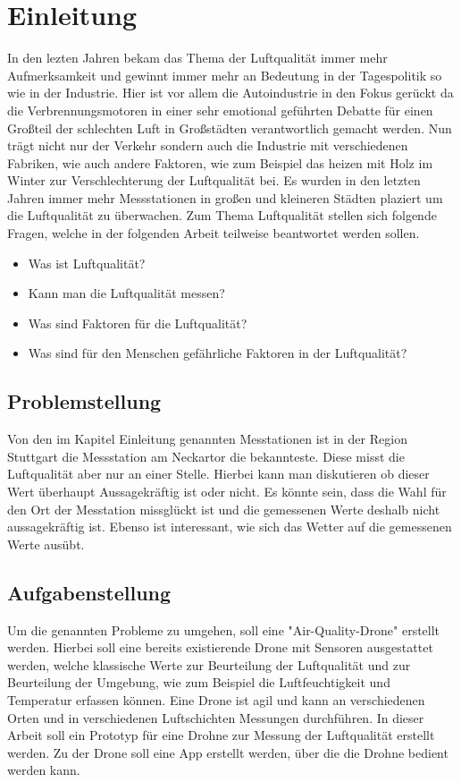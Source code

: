 
\chapter{Einleitung}\label{cha:Einleitung}
In den lezten Jahren bekam das Thema der Luftqualität immer mehr Aufmerksamkeit und gewinnt immer mehr an Bedeutung in der Tagespolitik so wie in der Industrie. Hier ist vor allem die Autoindustrie in den Fokus gerückt da die Verbrennungsmotoren in einer sehr emotional geführten Debatte für einen Großteil der schlechten Luft in Großstädten verantwortlich gemacht werden. Nun trägt nicht nur der Verkehr sondern auch die Industrie mit verschiedenen Fabriken, wie auch andere Faktoren, wie zum Beispiel das heizen mit Holz im Winter zur Verschlechterung der Luftqualität bei. Es wurden in den letzten Jahren immer mehr Messstationen in großen und kleineren Städten plaziert um die Luftqualität zu überwachen.   
\newline
Zum Thema Luftqualität stellen sich folgende Fragen, welche in der folgenden Arbeit teilweise beantwortet werden sollen.
\begin{itemize}
	\item Was ist Luftqualität?
	\item Kann man die Luftqualität messen?
	\item Was sind Faktoren für die Luftqualität?
	\item Was sind für den Menschen gefährliche Faktoren in der Luftqualität?
\end{itemize}	
 
\section{Problemstellung}\label{sec:Problemstellung}
Von den im Kapitel Einleitung genannten Messtationen ist in der Region Stuttgart die Messstation am Neckartor die bekannteste. Diese misst die Luftqualität aber nur an einer Stelle. Hierbei kann man diskutieren ob dieser Wert überhaupt Aussagekräftig ist oder nicht. Es könnte sein, dass die Wahl für den Ort der Messtation missglückt ist und die gemessenen Werte deshalb nicht aussagekräftig ist. Ebenso ist interessant, wie sich das Wetter auf die gemessenen Werte ausübt.

\section{Aufgabenstellung}\label{sec:Aufgabenstellung}
Um die genannten Probleme zu umgehen, soll eine "Air-Quality-Drone" erstellt werden. Hierbei soll eine bereits existierende Drone mit Sensoren ausgestattet werden, welche klassische Werte zur Beurteilung der Luftqualität und zur Beurteilung der Umgebung, wie zum Beispiel die Luftfeuchtigkeit und Temperatur erfassen können. Eine Drone ist agil und kann an verschiedenen Orten und in verschiedenen Luftschichten Messungen durchführen. 
\newline
In dieser Arbeit soll ein Prototyp für eine Drohne zur Messung der Luftqualität erstellt werden. Zu der Drone soll eine App erstellt werden, über die die Drohne bedient werden kann. 